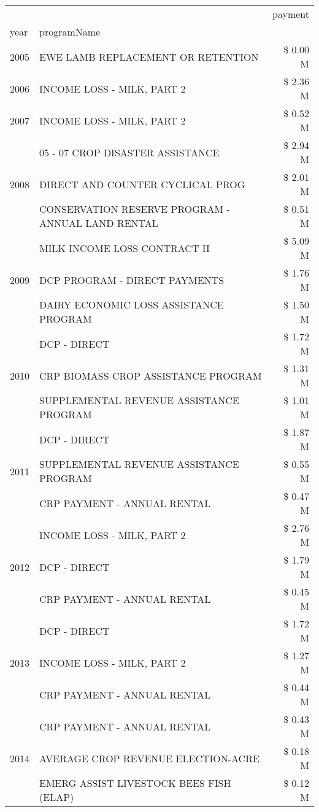 \begin{tabular}{llr}
\toprule
 &  & payment \\
year & programName &  \\
\midrule
2005 & EWE LAMB REPLACEMENT OR RETENTION & \$ 0.00 M \\
\cline{1-3}
2006 & INCOME LOSS - MILK, PART 2 & \$ 2.36 M \\
\cline{1-3}
2007 & INCOME LOSS - MILK, PART 2 & \$ 0.52 M \\
\cline{1-3}
\multirow[t]{3}{*}{2008} & 05 - 07 CROP DISASTER ASSISTANCE & \$ 2.94 M \\
 & DIRECT AND COUNTER CYCLICAL PROG & \$ 2.01 M \\
 & CONSERVATION RESERVE PROGRAM - ANNUAL LAND RENTAL & \$ 0.51 M \\
\cline{1-3}
\multirow[t]{3}{*}{2009} & MILK INCOME LOSS CONTRACT II & \$ 5.09 M \\
 & DCP PROGRAM - DIRECT PAYMENTS & \$ 1.76 M \\
 & DAIRY ECONOMIC LOSS ASSISTANCE PROGRAM & \$ 1.50 M \\
\cline{1-3}
\multirow[t]{3}{*}{2010} & DCP - DIRECT & \$ 1.72 M \\
 & CRP BIOMASS CROP ASSISTANCE PROGRAM & \$ 1.31 M \\
 & SUPPLEMENTAL REVENUE ASSISTANCE PROGRAM & \$ 1.01 M \\
\cline{1-3}
\multirow[t]{3}{*}{2011} & DCP - DIRECT & \$ 1.87 M \\
 & SUPPLEMENTAL REVENUE ASSISTANCE PROGRAM & \$ 0.55 M \\
 & CRP PAYMENT - ANNUAL RENTAL & \$ 0.47 M \\
\cline{1-3}
\multirow[t]{3}{*}{2012} & INCOME LOSS - MILK, PART 2 & \$ 2.76 M \\
 & DCP - DIRECT & \$ 1.79 M \\
 & CRP PAYMENT - ANNUAL RENTAL & \$ 0.45 M \\
\cline{1-3}
\multirow[t]{3}{*}{2013} & DCP - DIRECT & \$ 1.72 M \\
 & INCOME LOSS - MILK, PART 2 & \$ 1.27 M \\
 & CRP PAYMENT - ANNUAL RENTAL & \$ 0.44 M \\
\cline{1-3}
\multirow[t]{3}{*}{2014} & CRP PAYMENT - ANNUAL RENTAL & \$ 0.43 M \\
 & AVERAGE CROP REVENUE ELECTION-ACRE & \$ 0.18 M \\
 & EMERG ASSIST LIVESTOCK BEES FISH (ELAP) & \$ 0.12 M \\
\cline{1-3}

\end{tabular}

